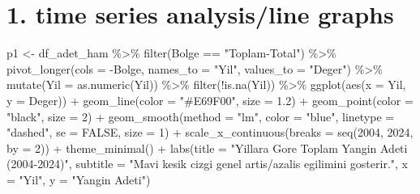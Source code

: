 \documentclass[
  11pt,
  a4paper,
  DIV=11,
  numbers=noendperiod]{scrartcl}
\newenvironment{Shaded}{\begin{snugshade}}{\end{snugshade}}
\newcommand{\AttributeTok}[1]{\textcolor[rgb]{0.40,0.45,0.13}{#1}}
\newcommand{\ConstantTok}[1]{\textcolor[rgb]{0.56,0.35,0.01}{#1}}
\newcommand{\DecValTok}[1]{\textcolor[rgb]{0.68,0.00,0.00}{#1}}
\newcommand{\FloatTok}[1]{\textcolor[rgb]{0.68,0.00,0.00}{#1}}
\newcommand{\FunctionTok}[1]{\textcolor[rgb]{0.28,0.35,0.67}{#1}}
\newcommand{\NormalTok}[1]{\textcolor[rgb]{0.00,0.23,0.31}{#1}}
\newcommand{\OtherTok}[1]{\textcolor[rgb]{0.00,0.23,0.31}{#1}}
\newcommand{\SpecialCharTok}[1]{\textcolor[rgb]{0.37,0.37,0.37}{#1}}
\newcommand{\StringTok}[1]{\textcolor[rgb]{0.13,0.47,0.30}{#1}}
\begin{document}
\section{1. time series analysis/line
graphs}\label{time-series-analysisline-graphs}

\begin{Shaded}
\begin{Highlighting}[]
\NormalTok{p1 }\OtherTok{\textless{}{-}}\NormalTok{ df\_adet\_ham }\SpecialCharTok{\%\textgreater{}\%}
  \FunctionTok{filter}\NormalTok{(Bolge }\SpecialCharTok{==} \StringTok{"Toplam{-}Total"}\NormalTok{) }\SpecialCharTok{\%\textgreater{}\%}
  \FunctionTok{pivot\_longer}\NormalTok{(}\AttributeTok{cols =} \SpecialCharTok{{-}}\NormalTok{Bolge, }\AttributeTok{names\_to =} \StringTok{"Yil"}\NormalTok{, }\AttributeTok{values\_to =} \StringTok{"Deger"}\NormalTok{) }\SpecialCharTok{\%\textgreater{}\%}
  \FunctionTok{mutate}\NormalTok{(}\AttributeTok{Yil =} \FunctionTok{as.numeric}\NormalTok{(Yil)) }\SpecialCharTok{\%\textgreater{}\%}
  \FunctionTok{filter}\NormalTok{(}\SpecialCharTok{!}\FunctionTok{is.na}\NormalTok{(Yil)) }\SpecialCharTok{\%\textgreater{}\%}
  \FunctionTok{ggplot}\NormalTok{(}\FunctionTok{aes}\NormalTok{(}\AttributeTok{x =}\NormalTok{ Yil, }\AttributeTok{y =}\NormalTok{ Deger)) }\SpecialCharTok{+}
  \FunctionTok{geom\_line}\NormalTok{(}\AttributeTok{color =} \StringTok{"\#E69F00"}\NormalTok{, }\AttributeTok{size =} \FloatTok{1.2}\NormalTok{) }\SpecialCharTok{+}
  \FunctionTok{geom\_point}\NormalTok{(}\AttributeTok{color =} \StringTok{"black"}\NormalTok{, }\AttributeTok{size =} \DecValTok{2}\NormalTok{) }\SpecialCharTok{+}
  \FunctionTok{geom\_smooth}\NormalTok{(}\AttributeTok{method =} \StringTok{"lm"}\NormalTok{, }\AttributeTok{color =} \StringTok{"blue"}\NormalTok{, }\AttributeTok{linetype =} \StringTok{"dashed"}\NormalTok{, }\AttributeTok{se =} \ConstantTok{FALSE}\NormalTok{, }\AttributeTok{size =} \DecValTok{1}\NormalTok{) }\SpecialCharTok{+} 
  \FunctionTok{scale\_x\_continuous}\NormalTok{(}\AttributeTok{breaks =} \FunctionTok{seq}\NormalTok{(}\DecValTok{2004}\NormalTok{, }\DecValTok{2024}\NormalTok{, }\AttributeTok{by =} \DecValTok{2}\NormalTok{)) }\SpecialCharTok{+}
  \FunctionTok{theme\_minimal}\NormalTok{() }\SpecialCharTok{+}
  \FunctionTok{labs}\NormalTok{(}\AttributeTok{title =} \StringTok{"Yillara Gore Toplam Yangin Adeti (2004{-}2024)"}\NormalTok{, }
       \AttributeTok{subtitle =} \StringTok{"Mavi kesik cizgi genel artis/azalis egilimini gosterir."}\NormalTok{,}
       \AttributeTok{x =} \StringTok{"Yil"}\NormalTok{, }\AttributeTok{y =} \StringTok{"Yangin Adeti"}\NormalTok{)}
\end{Highlighting}
\end{Shaded}
\end{document}
